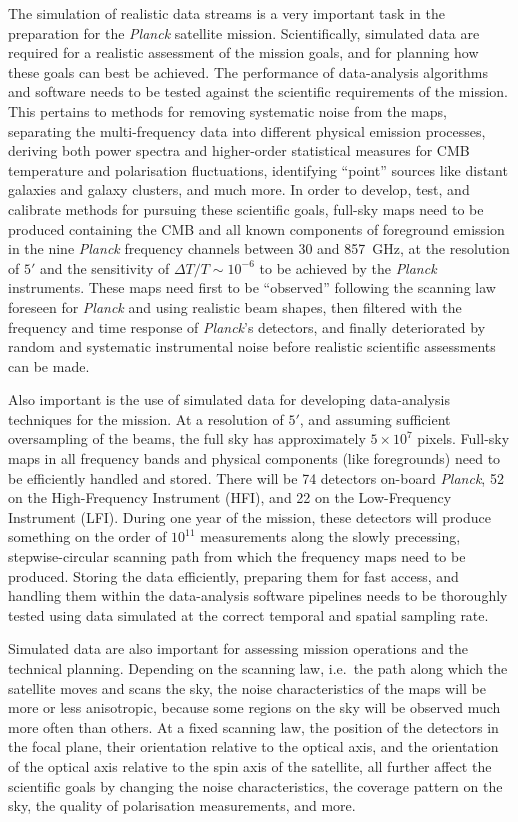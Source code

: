 \documentclass{aa}
\begin{document}
The simulation of realistic data streams is a very important task in
the preparation for the \emph{Planck} satellite mission. Scientifically,
simulated data are required for a realistic assessment of the mission
goals, and for planning how these goals can best be achieved. The
performance of data-analysis algorithms and software needs to be
tested against the scientific requirements of the mission. This
pertains to methods for removing systematic noise from the maps,
separating the multi-frequency data into different physical emission
processes, deriving both
power spectra and higher-order statistical measures for CMB
temperature and polarisation fluctuations, identifying ``point''
sources like distant galaxies and galaxy clusters, and much
more. In order to develop, test, and calibrate methods for pursuing
these scientific goals, full-sky maps need to be produced containing
the CMB and all known components of foreground emission in the nine
\emph{Planck} frequency channels between 30 and 857~GHz, at the
resolution of $5'$ and the sensitivity of $\Delta T/T\sim10^{-6}$ to
be achieved by the \emph{Planck} instruments. These maps need first to be
``observed'' following the scanning law foreseen for \emph{Planck} and
using realistic beam shapes, then filtered with the frequency and time
response of \emph{Planck}'s detectors, and finally deteriorated by random and
systematic instrumental noise before realistic scientific assessments
can be made.

Also important is the use of simulated data for developing
data-analysis techniques for the mission. At a resolution of $5'$,
and assuming sufficient oversampling of the beams, the full sky has
approximately $5\times10^7$ pixels. Full-sky maps in all frequency bands and
physical components (like foregrounds) need to be efficiently handled and
stored. There
will be 74 detectors on-board \emph{Planck}, 52 on the High-Frequency
Instrument (HFI), and 22 on the Low-Frequency Instrument (LFI). During
one year of the mission, these detectors will produce something on the order of
$10^{11}$ measurements along the slowly precessing, stepwise-circular
scanning path from which the frequency maps need to be
produced. Storing the data efficiently, preparing them for fast
access, and handling them within the data-analysis software pipelines
needs to be thoroughly tested using data simulated at the correct
temporal and spatial sampling rate.

Simulated data are also important for assessing mission operations and
the technical planning. Depending on the scanning law, i.e.~the path
along which the satellite moves and scans the sky, the noise
characteristics of the maps will be more or less anisotropic, because
some regions on the sky will be observed much more often than
others. At a fixed scanning law, the position of the detectors in the
focal plane, their orientation relative to the optical
axis, and the orientation of the optical axis relative to the spin
axis of the satellite, all further affect the scientific goals by changing
the noise characteristics, the coverage pattern on the sky, the
quality of polarisation measurements, and more.
\end{document}
